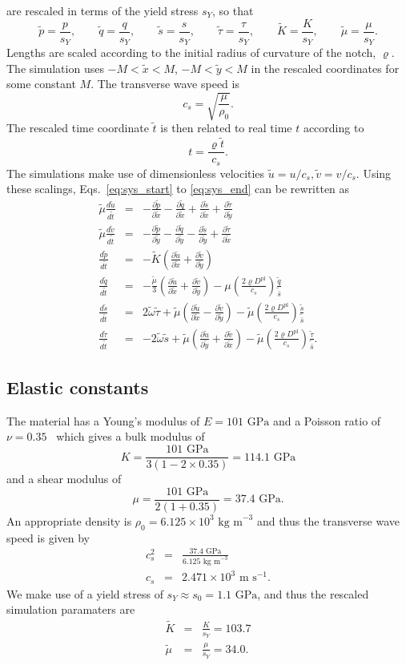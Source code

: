 \documentclass[12pt]{article}
\newcommand{\p}{\partial}
\newcommand{\GPa}{\textrm{~GPa}}
\newcommand{\Dpl}{D^\textrm{pl}}
\newcommand{\tT}{\tilde{t}}
\newcommand{\xT}{\tilde{x}}
\newcommand{\yT}{\tilde{y}}
\newcommand{\uT}{\tilde{u}}
\newcommand{\vT}{\tilde{v}}
\newcommand{\KT}{\tilde{K}}
\newcommand{\pT}{\tilde{p}}
\newcommand{\sT}{\tilde{s}}
\newcommand{\qT}{\tilde{q}}
\newcommand{\tauT}{\tilde{\tau}}
\newcommand{\muT}{\tilde{\mu}}
\newcommand{\drtT}[1]{\frac{d #1}{d \tT}}
\newcommand{\prxT}[1]{\frac{\p #1}{\p \xT}}
\newcommand{\pryT}[1]{\frac{\p #1}{\p \yT}}
\newcommand{\sY}{s_Y}
\newcommand{\bs}{\bar{s}}
\begin{document}
are rescaled in terms of the yield stress $\sY$, so that
\[
\pT=\frac{p}{\sY}, \qquad \qT = \frac{q}{\sY}, \qquad \sT = \frac{s}{\sY}, \qquad \tauT = \frac{\tau}{\sY}, \qquad \KT = \frac{K}{\sY}, \qquad \muT = \frac{\mu}{\sY}.
\]
Lengths are scaled according to the initial radius of curvature of the notch,
$\varrho$. The simulation uses $-M<\tilde{x}<M$, $-M<\tilde{y}<M$ in the
rescaled coordinates for some constant $M$. The transverse wave speed is
\[
c_s = \sqrt{\frac{\mu}{\rho_0}}.
\]
The rescaled time coordinate $\tT$ is then related to real time $t$ according
to
\[
t = \frac{\varrho\tT}{c_s}. 
\]
The simulations make use of dimensionless velocities $\uT = u/c_s, \vT =
v/c_s$. Using these scalings, Eqs.~\ref{eq:sys_start} to \ref{eq:sys_end} can
be rewritten as
\begin{eqnarray}
  \muT \drtT{\uT}&=&-\prxT{\pT}-\prxT{\qT}+\prxT{\sT}+\pryT{\tauT} \\
  \muT \drtT{\vT}&=&-\pryT{\pT}-\pryT{\qT}-\pryT{\sT}+\prxT{\tauT} \\
  \drtT{\pT} &=& -\KT \left(\prxT{\uT} +\pryT{\vT}\right) \\
  \drtT{\qT} &=& -\frac{\muT}{3} \left(\prxT{\uT} +\pryT{\vT}\right) - \mu \left(\frac{2\varrho \Dpl}{c_s}\right) \frac{\qT}{\tilde{\bs}} \\
  \label{eq:res_s} \drtT{\sT} &=& 2\tilde{\omega} \tauT + \muT\left( \prxT{\uT} - \pryT{\vT} \right) - \muT \left(\frac{2 \varrho \Dpl}{c_s}\right) \frac{\sT}{\tilde{\bs}} \\
  \label{eq:res_tau} \drtT{\tauT} &=& - 2\tilde{\omega} \sT + \muT \left( \pryT{\uT} + \prxT{\vT} \right) - \muT \left(\frac{2 \varrho \Dpl}{c_s}\right) \frac{\tauT}{\tilde{\bs}}.
\end{eqnarray}

\subsection*{Elastic constants}
The material has a Young's modulus of $E=101\GPa$ and a Poisson ratio
of $\nu=0.35$~\cite{wang04} which gives a bulk modulus of
\[
K=\frac{101\GPa}{3(1-2\times0.35)} = 114.1 \GPa
\]
and a shear modulus of
\[
\mu=\frac{101\GPa}{2(1+0.35)} = 37.4 \GPa.
\]
An appropriate density is $\rho_0=6.125\times10^3\textrm{ kg m}^{-3}$ and thus
the transverse wave speed is given by
\begin{eqnarray*}
c^2_s &=& \frac{37.4\GPa}{6.125 \textrm{ kg m}^{-3}} \\
c_s &=& 2.471 \times 10^3 \textrm{ m s}^{-1}.
\end{eqnarray*}
We make use of a yield stress of $\sY \approx s_0 = 1.1 \GPa$, and thus the
rescaled simulation paramaters are
\begin{eqnarray*}
  \tilde{K}&=&\frac{K}{\sY} = 103.7 \\
  \tilde{\mu}&=&\frac{\mu}{\sY} = 34.0.
\end{eqnarray*}
\end{document}
